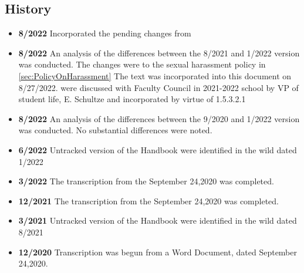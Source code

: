 	\subsection{History}
		\begin{itemize}
			\item{{\bfseries 8/2022} Incorporated the pending changes from }
			\item{{\bfseries 8/2022} An analysis of the differences between the 8/2021 and 1/2022 version was conducted.
				The changes were to the sexual harassment policy in
				\ref{sec:PolicyOnHarassment}
				The text was incorporated into this document on 8/27/2022.
				were discussed with Faculty Council in 2021-2022 school by VP of student life, E. Schultze and incorporated by virtue of 1.5.3.2.1
			}
			\item{{\bfseries 8/2022} An analysis of the differences between the 9/2020 and 1/2022 version was conducted. No substantial differences were noted.}
			\item{{\bfseries 6/2022} Untracked version of the Handbook were identified in the wild dated 1/2022}
			\item{{\bfseries 3/2022} The transcription from the September 24,2020 was completed.}
			\item{{\bfseries 12/2021} The transcription from the September 24,2020 was completed.}
			\item{{\bfseries 3/2021} Untracked version of the Handbook were identified in the wild dated 8/2021}
			\item{{\bfseries 12/2020} Transcription was begun from a Word Document, dated September 24,2020.}
		\end{itemize}